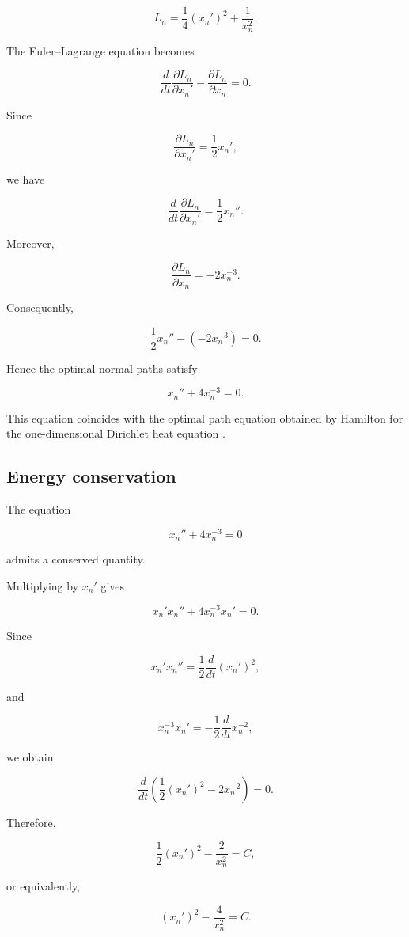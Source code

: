 \documentclass[10pt,a4paper]{amsart}
\begin{document}
\[
L_n
=
\frac14(x_n')^2
+
\frac1{x_n^2}.
\]


The Euler--Lagrange equation becomes

\[
\frac d{dt}
\frac{\partial L_n}{\partial x_n'}
-
\frac{\partial L_n}{\partial x_n}
=0 .
\]


Since

\[
\frac{\partial L_n}{\partial x_n'}
=
\frac12x_n',
\]

we have

\[
\frac d{dt}
\frac{\partial L_n}{\partial x_n'}
=
\frac12x_n'' .
\]


Moreover,

\[
\frac{\partial L_n}{\partial x_n}
=
-2x_n^{-3}.
\]


Consequently,

\[
\frac12x_n''
-
(-2x_n^{-3})
=
0 .
\]


Hence the optimal normal paths satisfy

\[
\boxed{
x_n''
+
4x_n^{-3}
=
0 .
}
\]


This equation coincides with the optimal path equation obtained by
Hamilton for the one-dimensional Dirichlet heat equation
\cite{Hamilton2011}.



\subsection{Energy conservation}


The equation

\[
x_n''
+
4x_n^{-3}
=
0
\]

admits a conserved quantity.

Multiplying by $x_n'$ gives

\[
x_n'x_n''
+
4x_n^{-3}x_n'
=
0 .
\]


Since

\[
x_n'x_n''
=
\frac12
\frac d{dt}(x_n')^2,
\]

and

\[
x_n^{-3}x_n'
=
-\frac12
\frac d{dt}x_n^{-2},
\]

we obtain

\[
\frac d{dt}
\left(
\frac12(x_n')^2
-
2x_n^{-2}
\right)
=0 .
\]


Therefore,

\[
\boxed{
\frac12(x_n')^2
-
\frac2{x_n^2}
=
C ,
}
\]

or equivalently,

\[
\boxed{
(x_n')^2
-
\frac4{x_n^2}
=
C .
}
\]
\end{document}
